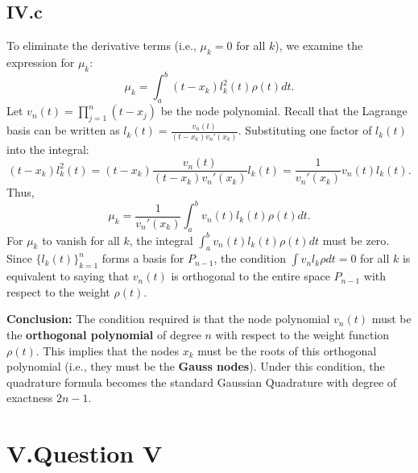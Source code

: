 \documentclass[a4paper]{article}
\begin{document}
\subsection*{IV.c}
To eliminate the derivative terms (i.e., $\mu_k = 0$ for all $k$), we examine the expression for $\mu_k$:
\[
\mu_k = \int_a^b (t - x_k) l_k^2(t) \rho(t) dt.
\]
Let $v_n(t) = \prod_{j=1}^n (t - x_j)$ be the node polynomial. Recall that the Lagrange basis can be written as $l_k(t) = \frac{v_n(t)}{(t - x_k) v_n'(x_k)}$.
Substituting one factor of $l_k(t)$ into the integral:
\[
(t - x_k) l_k^2(t) = (t - x_k) \frac{v_n(t)}{(t - x_k) v_n'(x_k)} l_k(t) = \frac{1}{v_n'(x_k)} v_n(t) l_k(t).
\]
Thus,
\[
\mu_k = \frac{1}{v_n'(x_k)} \int_a^b v_n(t) l_k(t) \rho(t) dt.
\]
For $\mu_k$ to vanish for all $k$, the integral $\int_a^b v_n(t) l_k(t) \rho(t) dt$ must be zero.
Since $\{l_k(t)\}_{k=1}^n$ forms a basis for ${P}_{n-1}$, the condition $\int v_n l_k \rho dt = 0$ for all $k$ is equivalent to saying that $v_n(t)$ is orthogonal to the entire space ${P}_{n-1}$ with respect to the weight $\rho(t)$.

\textbf{Conclusion:}
The condition required is that the node polynomial $v_n(t)$ must be the \textbf{orthogonal polynomial} of degree $n$ with respect to the weight function $\rho(t)$. This implies that the nodes $x_k$ must be the roots of this orthogonal polynomial (i.e., they must be the \textbf{Gauss nodes}). Under this condition, the quadrature formula becomes the standard Gaussian Quadrature with degree of exactness $2n-1$.

\section*{V.Question V}
\end{document}
